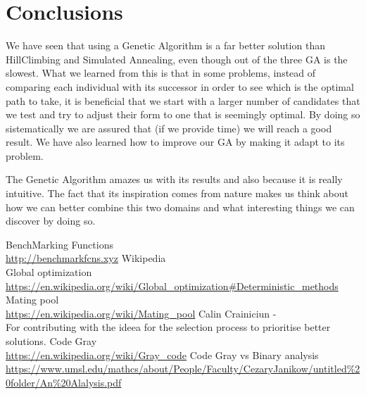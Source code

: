 \documentclass{article}
\begin{document}
\section{Conclusions}
We have seen that using a Genetic Algorithm is a far better solution than HillClimbing and Simulated Annealing, even though out of the three GA is the slowest. What we learned from this is that in some problems, instead of comparing each individual with its successor in order to see which is the optimal path to take, it is beneficial that we start with a larger number of candidates that we test and try to adjust their form to one that is seemingly optimal. By doing so sistematically we are assured that (if we provide time) we will reach a good result. We have also learned how to improve our GA by making it adapt to its problem.\\
\par The Genetic Algorithm amazes us with its results and also because it is really intuitive. The fact that its inspiration comes from nature makes us think about how we can better combine this two domains and what interesting things we can discover by doing so.

\begin{thebibliography}

BenchMarking Functions\\
\url{http://benchmarkfcns.xyz}
Wikipedia\\Global optimization\\
\url{https://en.wikipedia.org/wiki/Global_optimization#Deterministic_methods}
Mating pool\\
\url{https://en.wikipedia.org/wiki/Mating_pool}
Calin Crainiciun - \\
For contributing with the ideea for the selection process to prioritise better solutions.
Code Gray\\
\url{https://en.wikipedia.org/wiki/Gray_code}
Code Gray vs Binary analysis\\
\url{https://www.umsl.edu/mathcs/about/People/Faculty/CezaryJanikow/untitled%20folder/An%20Alalysis.pdf}
\end{thebibliography}
\end{document}
